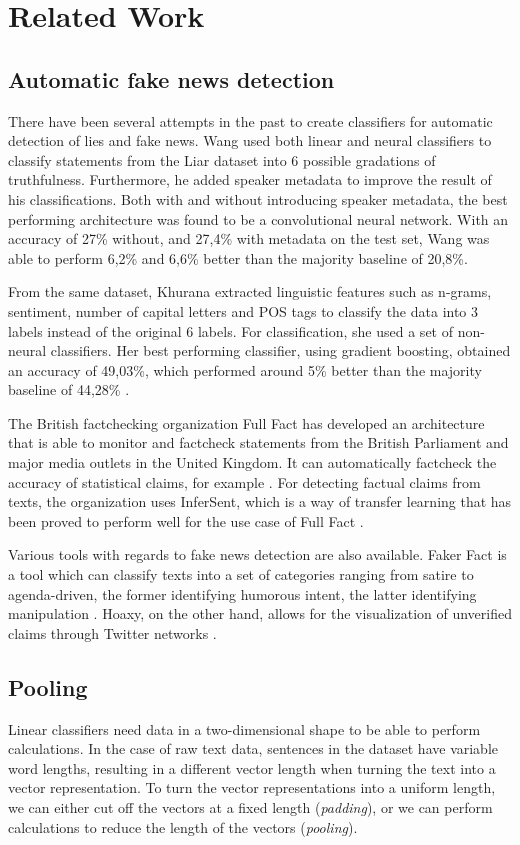 \section{Related Work}
\subsection{Automatic fake news detection}
There have been several attempts in the past to create classifiers for automatic detection of lies and fake news. 
Wang used both linear and neural classifiers to classify statements from the Liar dataset into 6 possible gradations of truthfulness. 
Furthermore, he added speaker metadata to improve the result of his classifications.
Both with and without introducing speaker metadata, the best performing architecture was found to be a convolutional neural network. 
With an accuracy of 27\% without, and 27,4\% with metadata on the test set, Wang was able to perform 6,2\% and 6,6\% better than the majority baseline of 20,8\%\cite{wang2018}.

From the same dataset, Khurana extracted linguistic features such as n-grams, sentiment, number of capital letters and POS tags to classify the data into 3 labels instead of the original 6 labels. 
For classification, she used a set of non-neural classifiers. 
Her best performing classifier, using gradient boosting, obtained an accuracy of 49,03\%, which performed around 5\% better than the majority baseline of 44,28\% \cite{khurana2017}.

The British factchecking organization Full Fact has developed an architecture that is able to monitor and factcheck statements from the British Parliament and major media outlets in the United Kingdom. 
It can automatically factcheck the accuracy of statistical claims, for example \cite{babakar2016}.
For detecting factual claims from texts, the organization uses InferSent, which is a way of transfer learning that has been proved to perform well for the use case of Full Fact \cite{pydata2018}.

Various tools with regards to fake news detection are also available. 
Faker Fact is a tool which can classify texts into a set of categories ranging from satire to agenda-driven, the former identifying humorous intent, the latter identifying manipulation \cite{fakerfact}. 
Hoaxy, on the other hand, allows for the visualization of unverified claims through Twitter networks \cite{shao2016}. 

\subsection{Pooling}
Linear classifiers need data in a two-dimensional shape to be able to perform calculations. 
In the case of raw text data, sentences in the dataset have variable word lengths, resulting in a different vector length when turning the text into a vector representation.
To turn the vector representations into a uniform length, we can either cut off the vectors at a fixed length (\textit{padding}), or we can perform calculations to reduce the length of the vectors (\textit{pooling}).


